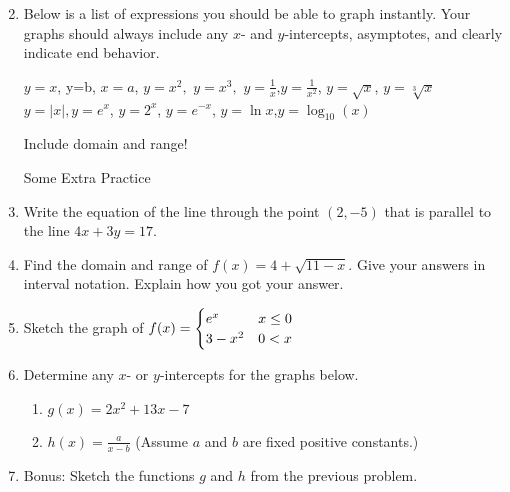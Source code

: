 \documentclass[11pt,fleqn]{article}
\begin{document}
\begin{enumerate}
\begin{multicols}{2}
\begin{enumerate}
	\vspace{1in}     
	 \end{enumerate}
\end{multicols}
\newpage
\item Below is a list of expressions you should be able to graph instantly. Your graphs should always include any $x$- and $y$-intercepts, asymptotes, and clearly indicate end behavior.
\begin{center}
$y=x$, \quad y=b, \quad $x=a$, \quad$y=x^2,$ \quad$y=x^3,$ \quad$y=\frac{1}{x}$,\quad $y=\frac{1}{x^2}$, \quad $y=\sqrt{x}$, \quad $y=\sqrt[3]{x}$\\ $y=|x|,$\quad $y=e^x$, \quad $y=2^x$,  \quad$y=e^{-x}$, \quad$y=\ln x$,\quad$y=\log_{10}(x)$
\end{center}
\vfill
Include domain and range!
\newpage
\begin{center} Some Extra Practice \end{center}
\item Write the equation of the line through the point $(2,-5)$ that is parallel to the line $4x+3y=17.$
\vfill
\item Find the domain and range of $f(x) = 4+\sqrt{11 - x}.$ Give your answers in interval notation. Explain how you got your answer.
\vfill
\newpage
\item Sketch the graph of $f(x)=\begin{cases} e^x & x \leq 0 \cr 3-x^2 & 0 < x \cr \end{cases}$
\vfill
\item Determine any $x$- or $y$-intercepts for the graphs below.
	\begin{enumerate}
	\item $g(x)=2x^2+13x-7$
	\vfill
	\item $h(x)=\frac{a}{x-b}$ (Assume $a$ and $b$ are fixed positive constants.)
	\vfill
	\end{enumerate}
\item Bonus: Sketch the functions $g$ and $h$ from the previous problem.
\end{enumerate}
\end{document}
